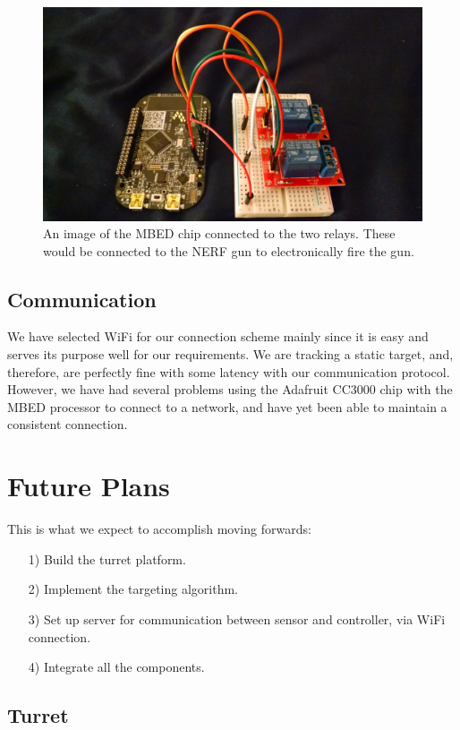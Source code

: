 \documentclass[journal]{IEEEtran}
\begin{document}
\begin{figure}[htbp]
    \centering
    \includegraphics[width=0.78\linewidth]{chip.jpg}
    \caption{An image of the MBED chip connected to the two relays. These would be connected to the NERF gun to electronically fire the gun.}
    \label{fig:chip}
\end{figure}

\subsection{Communication}

We have selected WiFi for our connection scheme mainly since it is easy and serves its purpose well for our requirements. We are tracking a static target, and, therefore, are perfectly fine with some latency with our communication protocol. However, we have had several problems using the Adafruit CC3000 chip with the MBED processor to connect to a network, and have yet been able to maintain a consistent connection.

\section{Future Plans}

This is what we expect to accomplish moving forwards:

\begin{itemize}
\item[1)]
Build the turret platform.
\item[2)]
Implement the targeting algorithm.
\item[3)]
Set up server for communication between sensor and controller, via WiFi connection.
\item[4)]
Integrate all the components.
\end{itemize}

\subsection{Turret}
\end{document}
